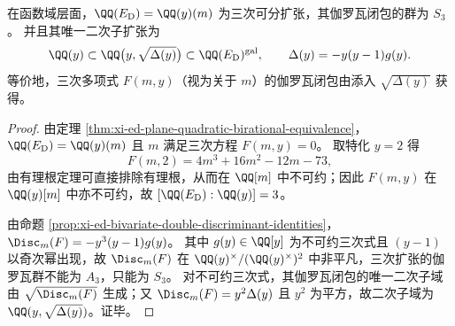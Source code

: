 \begin{corollary}\label{cor:xi-ed-functionfield-s3-structure-and-quadratic-resolvent}
在函数域层面，\(\QQ(E_{\mathrm D})=\QQ(y)(m)\) 为三次可分扩张，其伽罗瓦闭包的群为 \(S_3\)。
并且其唯一二次子扩张为
\[
\QQ(y)\subset \QQ\bigl(y,\sqrt{\Delta(y)}\bigr)\subset \QQ(E_{\mathrm D})^{\mathrm{gal}},
\qquad
\Delta(y)=-y(y-1)g(y).
\]
等价地，三次多项式 \(F(m,y)\)（视为关于 \(m\)）的伽罗瓦闭包由添入 \(\sqrt{\Delta(y)}\) 获得。
\end{corollary}
\begin{proof}
由定理 \ref{thm:xi-ed-plane-quadratic-birational-equivalence}，\(\QQ(E_{\mathrm D})=\QQ(y)(m)\) 且 \(m\) 满足三次方程 \(F(m,y)=0\)。
取特化 \(y=2\) 得
\[
F(m,2)=4m^3+16m^2-12m-73,
\]
由有理根定理可直接排除有理根，从而在 \(\QQ[m]\) 中不可约；因此 \(F(m,y)\) 在 \(\QQ(y)[m]\) 中亦不可约，故 \([\QQ(E_{\mathrm D}):\QQ(y)]=3\)。
\par
由命题 \ref{prop:xi-ed-bivariate-double-discriminant-identities}，\(\Disc_m(F)=-y^3(y-1)g(y)\)。
其中 \(g(y)\in\QQ[y]\) 为不可约三次式且 \((y-1)\) 以奇次幂出现，故 \(\Disc_m(F)\) 在 \(\QQ(y)^\times/(\QQ(y)^\times)^2\) 中非平凡，三次扩张的伽罗瓦群不能为 \(A_3\)，只能为 \(S_3\)。
对不可约三次式，其伽罗瓦闭包的唯一二次子域由 \(\sqrt{\Disc_m(F)}\) 生成；又 \(\Disc_m(F)=y^2\Delta(y)\) 且 \(y^2\) 为平方，故二次子域为 \(\QQ(y,\sqrt{\Delta(y)})\)。证毕。
\end{proof}

